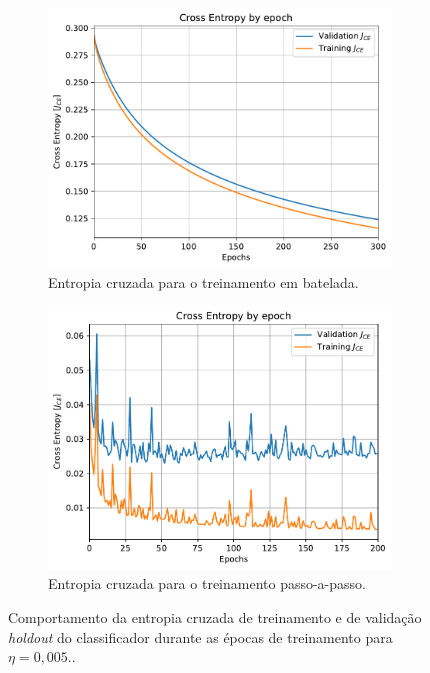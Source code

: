\begin{figure}[H]
	\centering
	\begin{subfigure}{0.49\textwidth}
		\includegraphics[width=\linewidth]{img/0-005/CE_by_epoch-Batch-300}
		\caption{Entropia cruzada para o treinamento em batelada.}
		\label{fig:cebyepoch-batch-300}
	\end{subfigure}
	\begin{subfigure}{0.49\textwidth}
	\includegraphics[width=\linewidth]{img/0-005/CE_by_epoch-Step-200}
	\caption{Entropia cruzada para o treinamento passo-a-passo.}
	\label{fig:cebyepoch-Step-200}
	\end{subfigure}
	\caption{Comportamento da entropia cruzada de treinamento e de validação \textit{holdout} do classificador durante as épocas de treinamento para $\eta = 0,005$.. }
\end{figure}


